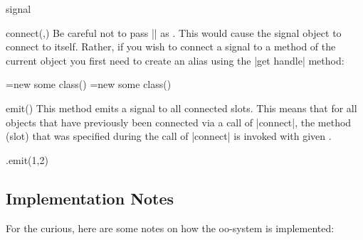 \begin{ooclass}{signal}
\begin{method}{connect(,)}
    Be careful not to pass |\pgfoothis| as . This
    would cause the signal object to connect to itself. Rather, if you
    wish to connect a signal to a method of the current object you
    first need to create an alias using the |get handle| method:
\begin{codeexample}
\pgfoonew \objA=new some class()
\pgfoonew \objB=new some class()
\end{codeexample}
  \end{method}

  \begin{method}{emit()}
    This method emits a signal to all connected slots. This means that
    for all objects that have previously been connected via a call of
    |connect|, the method (slot) that was specified during the call of
    |connect| is invoked with given .
\begin{codeexample}
\anothersignal.emit(1,2)
\end{codeexample}
  \end{method}
\end{ooclass}


\subsection{Implementation Notes}

For the curious, here are some notes on how the oo-system is
implemented:

